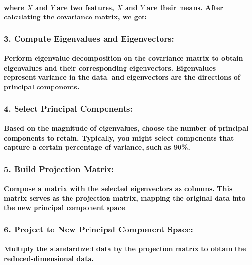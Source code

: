 \paragraph{where \(X\) and \(Y\) are two features, \(\bar{X}\) and \(\bar{Y}\) are their means. After calculating the covariance matrix, we get:}
% 
% 
% 
% 
% 
% 
% 
% 
% 
\subsubsection*{3. Compute Eigenvalues and Eigenvectors:}
% 
\paragraph{Perform eigenvalue decomposition on the covariance matrix to obtain eigenvalues and their corresponding eigenvectors. Eigenvalues represent variance in the data, and eigenvectors are the directions of principal components.}
% 
\subsubsection*{4. Select Principal Components:}
% 
\paragraph{Based on the magnitude of eigenvalues, choose the number of principal components to retain. Typically, you might select components that capture a certain percentage of variance, such as 90\%.}
% 
\subsubsection*{5. Build Projection Matrix:}
% 
\paragraph{Compose a matrix with the selected eigenvectors as columns. This matrix serves as the projection matrix, mapping the original data into the new principal component space.}
% 
\subsubsection*{6. Project to New Principal Component Space:}
\paragraph{Multiply the standardized data by the projection matrix to obtain the reduced-dimensional data.}
% 
% 
% 

